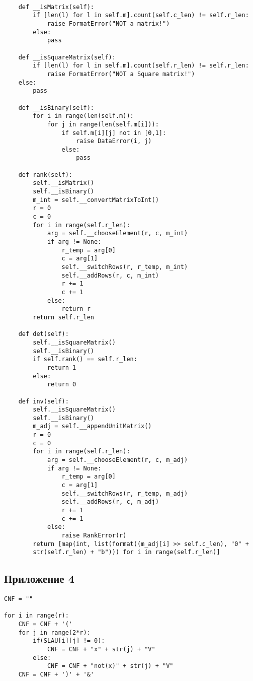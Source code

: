 \documentclass[12pt]{article}
\begin{document}
\begin{verbatim}
	
    def __isMatrix(self):
        if [len(l) for l in self.m].count(self.c_len) != self.r_len:
            raise FormatError("NOT a matrix!")
        else:
            pass

    def __isSquareMatrix(self):
        if [len(l) for l in self.m].count(self.r_len) != self.r_len:
            raise FormatError("NOT a Square matrix!")
    else:
        pass

    def __isBinary(self):
        for i in range(len(self.m)):
            for j in range(len(self.m[i])):
                if self.m[i][j] not in [0,1]:
                    raise DataError(i, j)
                else:
                    pass

    def rank(self):
        self.__isMatrix()
        self.__isBinary()
        m_int = self.__convertMatrixToInt()
        r = 0
        c = 0
        for i in range(self.r_len):
            arg = self.__chooseElement(r, c, m_int)
            if arg != None:
                r_temp = arg[0]
                c = arg[1]
                self.__switchRows(r, r_temp, m_int)
                self.__addRows(r, c, m_int)
                r += 1
				c += 1
			else:
				return r
		return self.r_len

	def det(self):
		self.__isSquareMatrix()
		self.__isBinary()
		if self.rank() == self.r_len:
			return 1
		else:
			return 0

    def inv(self):
        self.__isSquareMatrix()
		self.__isBinary()
		m_adj = self.__appendUnitMatrix()
		r = 0
		c = 0
		for i in range(self.r_len):
			arg = self.__chooseElement(r, c, m_adj)
			if arg != None:
				r_temp = arg[0]
				c = arg[1]
				self.__switchRows(r, r_temp, m_adj)
				self.__addRows(r, c, m_adj)
				r += 1
				c += 1
			else:
				raise RankError(r)
		return [map(int, list(format((m_adj[i] >> self.c_len), "0" + 
		str(self.r_len) + "b"))) for i in range(self.r_len)]
\end{verbatim}

\subsection{Приложение 4}

\begin{verbatim}
CNF = ""

for i in range(r):
    CNF = CNF + '('
    for j in range(2*r):
        if(SLAU[i][j] != 0):
            CNF = CNF + "x" + str(j) + "V"
        else:
            CNF = CNF + "not(x)" + str(j) + "V"
    CNF = CNF + ')' + '&'

\end{verbatim}
\end{document}
